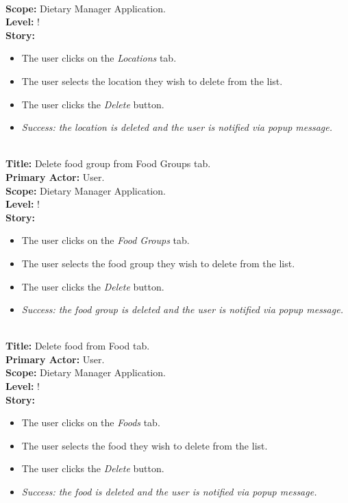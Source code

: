 \documentclass{article}
\begin{document}
\\
\textbf{Scope:} Dietary Manager Application.
\\
\textbf{Level:} !
\\
\textbf{Story:}
\begin{itemize}
    \item The user clicks on the \textit{Locations} tab.
    \item The user selects the location they wish to delete from the list.
    \item The user clicks the \textit{Delete} button.
    \item \em Success: \em the location is deleted and the user is notified via popup message.\\
\end{itemize}
\\
\textbf{Title:} Delete food group from Food Groups tab.
\\
\textbf{Primary Actor:} User.
\\
\textbf{Scope:} Dietary Manager Application.
\\
\textbf{Level:} !
\\
\textbf{Story:}
\begin{itemize}
    \item The user clicks on the \textit{Food Groups} tab.
    \item The user selects the food group they wish to delete from the list.
    \item The user clicks the \textit{Delete} button.
    \item \em Success: \em the food group is deleted and the user is notified via popup message.\\
\end{itemize}
\\
\textbf{Title:} Delete food from Food tab.
\\
\textbf{Primary Actor:} User.
\\
\textbf{Scope:} Dietary Manager Application.
\\
\textbf{Level:} !
\\
\textbf{Story:}
\begin{itemize}
    \item The user clicks on the \textit{Foods} tab.
    \item The user selects the food they wish to delete from the list.
    \item The user clicks the \textit{Delete} button.
    \item \em Success: \em the food is deleted and the user is notified via popup message.\\
\end{itemize}
\end{document}
